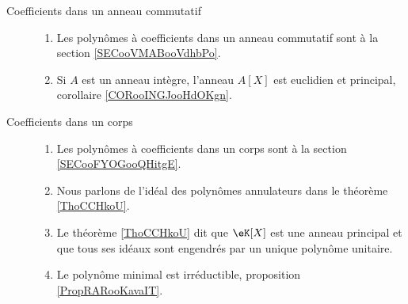 
\begin{description}
    \item[Coefficients dans un anneau commutatif]

        \begin{enumerate}
            \item
Les polynômes à coefficients dans un anneau commutatif  sont à la section \ref{SECooVMABooVdhbPo}.
\item Si \( A\) est un anneau intègre, l'anneau \( A[X]\) est euclidien et principal, corollaire \ref{CORooINGJooHdOKgn}.
        \end{enumerate}
        

    \item[Coefficients dans un corps]
        \begin{enumerate}
            \item
                
Les polynômes à coefficients dans un corps sont à la section \ref{SECooFYOGooQHitgE}.
\item
Nous parlons de l'idéal des polynômes annulateurs dans le théorème \ref{ThoCCHkoU}.
            \item
                Le théorème \ref{ThoCCHkoU} dit que \( \eK[X]\) est une anneau principal et que tous ses idéaux sont engendrés par un unique polynôme unitaire.
            \item
                Le polynôme minimal est irréductible, proposition \ref{PropRARooKavaIT}.
        \end{enumerate}
\end{description}




